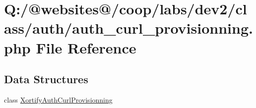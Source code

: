 \hypertarget{auth__curl__provisionning_8php}{\section{Q\-:/@websites@/coop/labs/dev2/class/auth/auth\-\_\-curl\-\_\-provisionning.php File Reference}
\label{auth__curl__provisionning_8php}
}
\subsection*{Data Structures}
\begin{DoxyCompactItemize}
\item 
class \hyperlink{class_xortify_auth_curl_provisionning}{Xortify\-Auth\-Curl\-Provisionning}
\end{DoxyCompactItemize}
